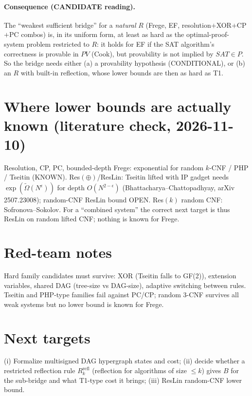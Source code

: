 \documentclass{article}\usepackage{amsmath,amssymb,amsthm}
\begin{document}
\paragraph{Consequence (CANDIDATE reading).} The ``weakest sufficient bridge'' for a \emph{natural} $R$ (Frege, EF, resolution$+$XOR$+$CP$+$PC combos) is, in its uniform form, at least as hard as the optimal-proof-system problem restricted to $R$: it holds for EF if the SAT algorithm's correctness is provable in $PV$ (Cook), but provability is not implied by $SAT\in P$. So the bridge needs either (a) a provability hypothesis (CONDITIONAL), or (b) an $R$ with built-in reflection, whose lower bounds are then as hard as T1.

\section*{Where lower bounds are actually known (literature check, 2026-11-10)}
Resolution, CP, PC, bounded-depth Frege: exponential for random $k$-CNF / PHP / Tseitin (KNOWN). Res$(\oplus)$/ResLin: Tseitin lifted with IP gadget needs $\exp(\tilde\Omega(N^\epsilon))$ for depth $O(N^{2-\epsilon})$ (Bhattacharya--Chattopadhyay, arXiv 2507.23008); random-CNF ResLin bound OPEN. Res$(k)$ random CNF: Sofronova--Sokolov. For a ``combined system'' the correct next target is thus ResLin on random lifted CNF; nothing is known for Frege.

\section*{Red-team notes}
Hard family candidates must survive: XOR (Tseitin falls to GF(2)), extension variables, shared DAG (tree-size vs DAG-size), adaptive switching between rules. Tseitin and PHP-type families fail against PC/CP; random 3-CNF survives all weak systems but no lower bound is known for Frege.

\section*{Next targets}
(i) Formalize multisigned DAG hypergraph states and cost; (ii) decide whether a restricted reflection rule $R^{\mathrm{refl}}_k$ (reflection for algorithms of size $\le k$) gives $B$ for the sub-bridge and what T1-type cost it brings; (iii) ResLin random-CNF lower bound.
\end{document}
